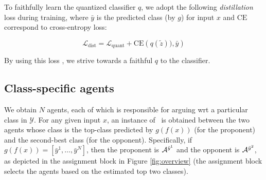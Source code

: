 

To %
faithfully learn the quantized classifier $q$, we adopt the following \emph{distillation} loss %
during training, where 
${\bar{y}}$ is the predicted class (by $g$) for input %
$x$ and 
$\mathrm{CE}$ correspond to cross-entropy loss: 


\begin{equation}
    \mathcal{L}_{\textrm{dist}} = \mathcal{L}_{\textrm{quant}} + \mathrm{CE}\left(q(%
    \tilde{z})), {\bar{y}} \right)
    \label{eqn:distillation}
\end{equation}

By using 
this loss%
,  we strive towards a faithful $q$ to the %
classifier.

\subsection{%
Class-specific agents} %
\label{sec:agent}

We obtain $N$ agents, each of which is responsible for arguing wrt a particular class in $\mathcal{Y}$. 
For any given input $x$, an instance of \FAXIC\ is obtained between the two agents whose class is the top-class predicted by  $g(f(x))$  (for the proponent) and the second-best class  (for the opponent).
Specifically, if $g(f(x))=[\bar{y}^1, \dots, \bar{y}^{N}]$,
then the proponent is $\mathcal{ A}^{\bar{y}^1}$ and
the opponent is $\mathcal{ A}^{\bar{y}^2}$, as depicted in the assignment block in Figure \ref{fig:overview} (the assignment block selects the agents based on the estimated top two classes).



